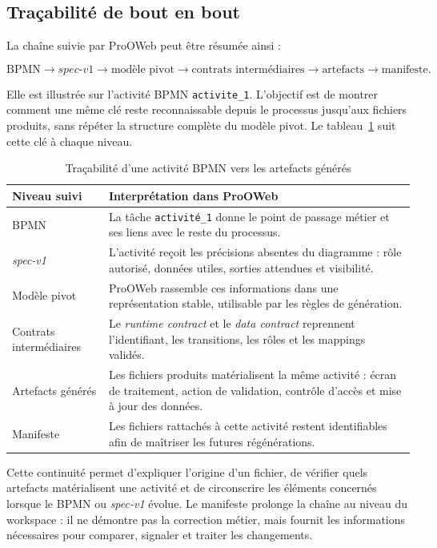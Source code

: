 \subsection{Traçabilité de bout en bout}

La chaîne suivie par ProOWeb peut être résumée ainsi :

\[
\text{BPMN} \longrightarrow \textit{spec-v1} \longrightarrow
\text{modèle pivot} \longrightarrow \text{contrats intermédiaires} \longrightarrow
\text{artefacts} \longrightarrow \text{manifeste}.
\]

Elle est illustrée sur l'activité BPMN \texttt{activite\_1}. L'objectif est de
montrer comment une même clé reste reconnaissable depuis le processus jusqu'aux
fichiers produits, sans répéter la structure complète du modèle pivot. Le
tableau~\ref{tab:chap3-exemple-tracabilite} suit cette clé à chaque niveau.

\begin{table}[H]
\centering
\caption{Traçabilité d'une activité BPMN vers les artefacts générés}
\label{tab:chap3-exemple-tracabilite}
\begin{tabularx}{\textwidth}{p{3.8cm}X}
\toprule
\textbf{Niveau suivi} & \textbf{Interprétation dans ProOWeb} \\
\midrule
BPMN & La tâche \texttt{activité\_1} donne le point de passage métier et ses liens avec le reste du processus. \\
\textit{spec-v1} & L'activité reçoit les précisions absentes du diagramme : rôle autorisé, données utiles, sorties attendues et visibilité. \\
Modèle pivot & ProOWeb rassemble ces informations dans une représentation stable, utilisable par les règles de génération. \\
Contrats intermédiaires & Le \textit{runtime contract} et le \textit{data contract} reprennent l'identifiant, les transitions, les rôles et les mappings validés. \\
Artefacts générés & Les fichiers produits matérialisent la même activité : écran de traitement, action de validation, contrôle d'accès et mise à jour des données. \\
Manifeste & Les fichiers rattachés à cette activité restent identifiables afin de maîtriser les futures régénérations. \\
\bottomrule
\end{tabularx}
\end{table}

Cette continuité permet d'expliquer l'origine d'un fichier, de vérifier quels
artefacts matérialisent une activité et de circonscrire les éléments concernés
lorsque le BPMN ou \textit{spec-v1} évolue. Le manifeste prolonge la chaîne au
niveau du workspace : il ne démontre pas la correction métier, mais fournit les
informations nécessaires pour comparer, signaler et traiter les changements.

